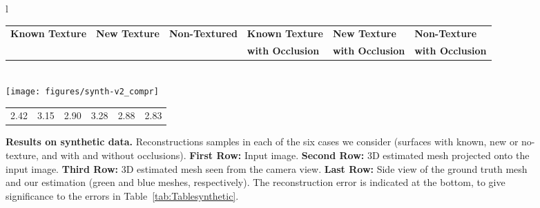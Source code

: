 \documentclass[10pt,twocolumn,letterpaper]{article}
\begin{document}
 
   	    \begin{figure*}[t!]
  	    	\centering
  	    	\begin{tabular}{l}
  	    		\begin{tabular}{p{2.5cm}  p{2.5cm} p{2.5cm} p{2.6cm} p{2.6cm} p{2.6cm}    }{\hspace{4mm}\small \bf Known Texture} &  {\hspace{5mm}\small \bf New Texture}  &{\hspace{4mm}\small \bf Non-Textured }& {\small \bf Known Texture}& {\hspace{1mm}\small \bf New Texture }  & {\small \bf Non-Texture}  \\
                      	    			{\hspace{4mm}\small \bf } &  {\hspace{5mm}\small \bf }  &{\hspace{4mm}\small \bf }& {\small \bf with Occlusion}& {\hspace{1mm}\small \bf with Occlusion }  & {\small \bf with Occlusion}  \\
  	    		\end{tabular}\\{\texttt{[image: figures/synth-v2\_compr]}}\\
  	    		\begin{tabular}{p{2.5cm}  p{2.5cm} p{2.5cm} p{2.5cm} p{2.5cm} p{2.5cm}    }{\hspace{10mm}2.42}  &  {\hspace{10mm}3.15}  & {\hspace{10mm}2.90}  & {\hspace{10mm}3.28}  & {\hspace{10mm}2.88} & {\hspace{10mm}2.83}\\
  	    		\end{tabular}
  	    	\end{tabular}
  	    	\vspace{-2mm}
  	    	\caption{{\bf Results on synthetic data.} Reconstructions samples in each of the six cases we consider (surfaces with known, new or no-texture, and with and without occlusions). {\bf First Row:} Input image. {\bf Second Row:} 3D estimated mesh projected onto the input image. {\bf Third Row:} 3D estimated mesh seen from the camera view. {\bf Last Row:} Side view of the ground truth mesh and our estimation (green and blue meshes, respectively). The reconstruction error is indicated at the bottom, to give significance to the errors in Table~\ref{tab:Tablesynthetic}.}
            \vspace{-4mm}
  	    	\label{fig:syntheticresults}
  	    \end{figure*}
\end{document}
